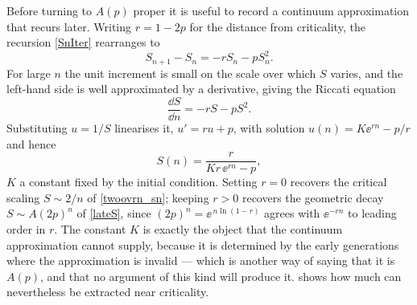 Before turning to $A(p)$ proper it is useful to record a continuum approximation
that recurs later. Writing $r = 1-2p$ for the distance from criticality, the
recursion \cref{SnIter} rearranges to
\begin{equation}
\label{eq:Sdiff}
S_{n+1}-S_n = -r S_n - p S_n^2 .
\end{equation}
For large $n$ the unit increment is small on the scale over which $S$ varies, and the
left-hand side is well approximated by a derivative, giving the Riccati equation
\begin{equation}
\label{eq:riccati}
\frac{\dd S}{\dd n} = -r S - p S^2 .
\end{equation}
Substituting $u = 1/S$ linearises it, $u' = ru + p$, with solution
$u(n) = K\ee^{rn} - p/r$ and hence
\begin{equation}
\label{eq:riccatisol}
S(n) = \frac{r}{K r\,\ee^{rn} - p},
\end{equation}
$K$ a constant fixed by the initial condition. Setting $r=0$ recovers the critical
scaling $S\sim2/n$ of \cref{twoovrn_sn}; keeping $r>0$ recovers the geometric decay
$S\sim A(2p)^n$ of \cref{lateS}, since $(2p)^n = \ee^{\,n\ln(1-r)}$ agrees with
$\ee^{-rn}$ to leading order in $r$. The constant $K$ is exactly the object that the continuum
approximation cannot supply, because it is determined by the early generations where
the approximation is invalid --- which is another way of saying that it is $A(p)$,
and that no argument of this kind will produce it.  shows how
much can nevertheless be extracted near criticality.

\FloatBarrier
